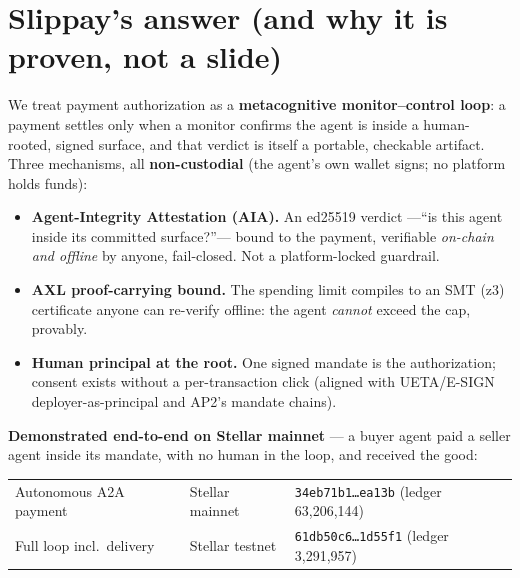 \documentclass[11pt]{article}
\begin{document}
\section*{Slippay's answer (and why it is proven, not a slide)}
We treat payment authorization as a \textbf{metacognitive monitor--control loop}: a payment
settles only when a monitor confirms the agent is inside a human-rooted, signed surface, and that
verdict is itself a portable, checkable artifact. Three mechanisms, all \textbf{non-custodial}
(the agent's own wallet signs; no platform holds funds):
\begin{itemize}
  \item \textbf{Agent-Integrity Attestation (AIA).} An \mbox{ed25519} verdict ---``is this agent
  inside its committed surface?''--- bound to the payment, verifiable \emph{on-chain and offline}
  by anyone, fail-closed. Not a platform-locked guardrail.
  \item \textbf{AXL proof-carrying bound.} The spending limit compiles to an SMT (z3) certificate
  anyone can re-verify offline: the agent \emph{cannot} exceed the cap, provably.
  \item \textbf{Human principal at the root.} One signed mandate is the authorization; consent
  exists without a per-transaction click (aligned with UETA/E-SIGN deployer-as-principal and
  AP2's mandate chains).
\end{itemize}

\textbf{Demonstrated end-to-end on Stellar mainnet} --- a buyer agent paid a seller agent inside
its mandate, with no human in the loop, and received the good:
\begin{center}\small
\begin{tabular}{@{}lll@{}}
\toprule
Autonomous A2A payment & Stellar mainnet & \texttt{34eb71b1\ldots ea13b} (ledger 63{,}206{,}144)\\
Full loop incl.\ delivery & Stellar testnet & \texttt{61db50c6\ldots 1d55f1} (ledger 3{,}291{,}957)\\
\bottomrule
\end{tabular}
\end{center}
\end{document}
